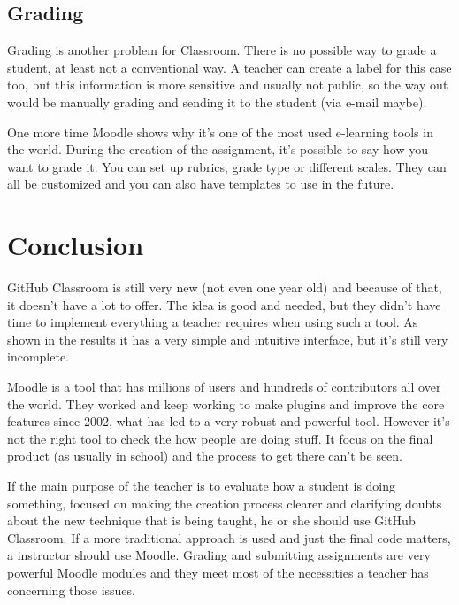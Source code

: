 \documentclass[12pt]{article}
\begin{document}
\subsection{Grading}

Grading is another problem for Classroom. There is no possible way to grade a student, at least not a conventional way. A teacher can create a label for this case too, but this information is more sensitive and usually not public, so the way out would be manually grading and sending it to the student (via e-mail maybe).

One more time Moodle shows why it's one of the most used e-learning tools in the world. During the creation of the assignment, it's possible to say how you want to grade it. You can set up rubrics, grade type or different scales. They can all be customized and you can also have templates to use in the future.

\section{Conclusion}

GitHub Classroom is still very new (not even one year old) and because of that, it doesn't have a lot to offer. The idea is good and needed, but they didn't have time to implement everything a teacher requires when using such a tool. As shown in the results it has a very simple and intuitive interface, but it's still very incomplete.

Moodle is a tool that has millions of users \cite{moodlestats} and hundreds of contributors all over the world.\cite{moodledev} They worked and keep working to make plugins and improve the core features since 2002, what has led to a very robust and powerful tool. However it's not the right tool to check the how people are doing stuff. It focus on the final product (as usually in school) and the process to get there can't be seen.

If the main purpose of the teacher is to evaluate how a student is doing something, focused on making the creation process clearer and clarifying doubts about the new technique that is being taught, he or she should use GitHub Classroom. If a more traditional approach is used and just the final code matters, a instructor should use Moodle. Grading and submitting assignments are very powerful Moodle modules and they meet most of the necessities a teacher has concerning those issues.

\printbibliography %
\end{document}
